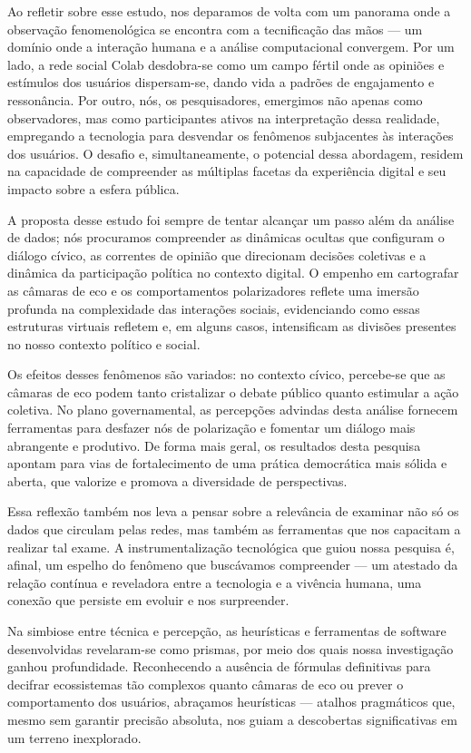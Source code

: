 Ao refletir sobre esse estudo, nos deparamos de volta com um panorama onde a observação fenomenológica se encontra com a tecnificação das mãos — um domínio onde a interação humana e a análise computacional convergem. Por um lado, a rede social Colab desdobra-se como um campo fértil onde as opiniões e estímulos dos usuários dispersam-se, dando vida a padrões de engajamento e ressonância. Por outro, nós, os pesquisadores, emergimos não apenas como observadores, mas como participantes ativos na interpretação dessa realidade, empregando a tecnologia para desvendar os fenômenos subjacentes às interações dos usuários. O desafio e, simultaneamente, o potencial dessa abordagem, residem na capacidade de compreender as múltiplas facetas da experiência digital e seu impacto sobre a esfera pública.

A proposta desse estudo foi sempre de tentar alcançar um passo além da análise de dados; nós procuramos compreender as dinâmicas ocultas que configuram o diálogo cívico, as correntes de opinião que direcionam decisões coletivas e a dinâmica da participação política no contexto digital. O empenho em cartografar as câmaras de eco e os comportamentos polarizadores reflete uma imersão profunda na complexidade das interações sociais, evidenciando como essas estruturas virtuais refletem e, em alguns casos, intensificam as divisões presentes no nosso contexto político e social.

Os efeitos desses fenômenos são variados: no contexto cívico, percebe-se que as câmaras de eco podem tanto cristalizar o debate público quanto estimular a ação coletiva. No plano governamental, as percepções advindas desta análise fornecem ferramentas para desfazer nós de polarização e fomentar um diálogo mais abrangente e produtivo. De forma mais geral, os resultados desta pesquisa apontam para vias de fortalecimento de uma prática democrática mais sólida e aberta, que valorize e promova a diversidade de perspectivas.

Essa reflexão também nos leva a pensar sobre a relevância de examinar não só os dados que circulam pelas redes, mas também as ferramentas que nos capacitam a realizar tal exame. A instrumentalização tecnológica que guiou nossa pesquisa é, afinal, um espelho do fenômeno que buscávamos compreender — um atestado da relação contínua e reveladora entre a tecnologia e a vivência humana, uma conexão que persiste em evoluir e nos surpreender.

Na simbiose entre técnica e percepção, as heurísticas e ferramentas de software desenvolvidas revelaram-se como prismas, por meio dos quais nossa investigação ganhou profundidade. Reconhecendo a ausência de fórmulas definitivas para decifrar ecossistemas tão complexos quanto câmaras de eco ou prever o comportamento dos usuários, abraçamos heurísticas — atalhos pragmáticos que, mesmo sem garantir precisão absoluta, nos guiam a descobertas significativas em um terreno inexplorado.

